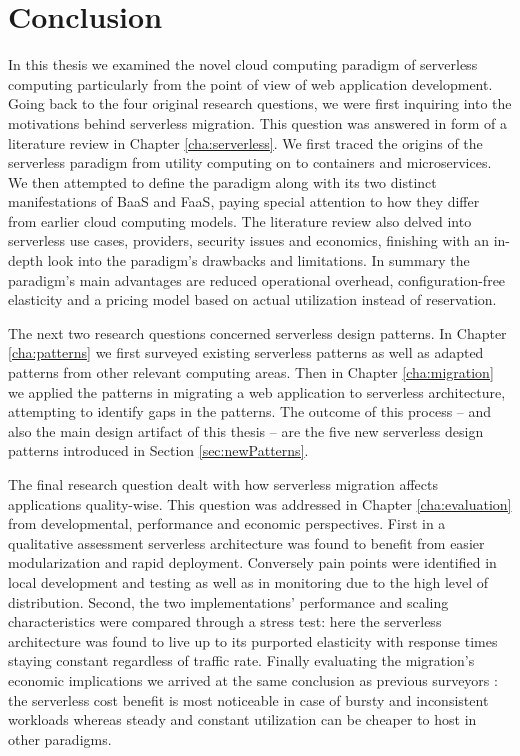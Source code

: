 \chapter{Conclusion}

In this thesis we examined the novel cloud computing paradigm of serverless computing particularly from the point of view of web application development. Going back to the four original research questions, we were first inquiring into the motivations behind serverless migration. This question was answered in form of a literature review in Chapter \ref{cha:serverless}. We first traced the origins of the serverless paradigm from utility computing on to containers and microservices. We then attempted to define the paradigm along with its two distinct manifestations of BaaS and FaaS, paying special attention to how they differ from earlier cloud computing models. The literature review also delved into serverless use cases, providers, security issues and economics, finishing with an in-depth look into the paradigm's drawbacks and limitations. In summary the paradigm's main advantages are reduced operational overhead, configuration-free elasticity and a pricing model based on actual utilization instead of reservation.

The next two research questions concerned serverless design patterns. In Chapter \ref{cha:patterns} we first surveyed existing serverless patterns as well as adapted patterns from other relevant computing areas. Then in Chapter \ref{cha:migration} we applied the patterns in migrating a web application to serverless architecture, attempting to identify gaps in the patterns. The outcome of this process -- and also the main design artifact of this thesis -- are the five new serverless design patterns introduced in Section \ref{sec:newPatterns}.

The final research question dealt with how serverless migration affects applications quality-wise. This question was addressed in Chapter \ref{cha:evaluation} from developmental, performance and economic perspectives. First in a qualitative assessment serverless  architecture was found to benefit from easier modularization and rapid deployment. Conversely pain points were identified in local development and testing as well as in monitoring due to the high level of distribution. Second, the two implementations' performance and scaling characteristics were compared through a stress test: here the serverless architecture was found to live up to its purported elasticity with response times staying constant regardless of traffic rate. Finally evaluating the migration's economic implications we arrived at the same conclusion as previous surveyors \parencite[including][]{baldini17currentTrends}: the serverless cost benefit is most noticeable in case of bursty and inconsistent workloads whereas steady and constant utilization can be cheaper to host in other paradigms.

